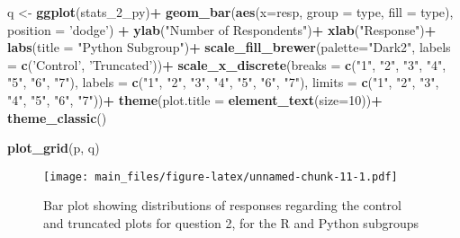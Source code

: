 \documentclass[
]{article}
\newenvironment{Shaded}{\begin{snugshade}}{\end{snugshade}}
\newcommand{\DataTypeTok}[1]{\textcolor[rgb]{0.13,0.29,0.53}{#1}}
\newcommand{\DecValTok}[1]{\textcolor[rgb]{0.00,0.00,0.81}{#1}}
\newcommand{\KeywordTok}[1]{\textcolor[rgb]{0.13,0.29,0.53}{\textbf{#1}}}
\newcommand{\NormalTok}[1]{#1}
\newcommand{\OperatorTok}[1]{\textcolor[rgb]{0.81,0.36,0.00}{\textbf{#1}}}
\newcommand{\StringTok}[1]{\textcolor[rgb]{0.31,0.60,0.02}{#1}}
\begin{document}
\begin{Shaded}
\begin{Highlighting}[]
\NormalTok{q <-}\StringTok{ }\KeywordTok{ggplot}\NormalTok{(stats_}\DecValTok{2}\NormalTok{_py)}\OperatorTok{+}
\StringTok{  }\KeywordTok{geom_bar}\NormalTok{(}\KeywordTok{aes}\NormalTok{(}\DataTypeTok{x=}\NormalTok{resp, }\DataTypeTok{group =}\NormalTok{ type, }\DataTypeTok{fill =}\NormalTok{ type), }\DataTypeTok{position =} \StringTok{'dodge'}\NormalTok{) }\OperatorTok{+}
\StringTok{  }\KeywordTok{ylab}\NormalTok{(}\StringTok{"Number of Respondents"}\NormalTok{)}\OperatorTok{+}
\StringTok{  }\KeywordTok{xlab}\NormalTok{(}\StringTok{"Response"}\NormalTok{)}\OperatorTok{+}
\StringTok{  }\KeywordTok{labs}\NormalTok{(}\DataTypeTok{title =} \StringTok{"Python Subgroup"}\NormalTok{)}\OperatorTok{+}
\StringTok{  }\KeywordTok{scale_fill_brewer}\NormalTok{(}\DataTypeTok{palette=}\StringTok{"Dark2"}\NormalTok{, }\DataTypeTok{labels =} \KeywordTok{c}\NormalTok{(}\StringTok{'Control'}\NormalTok{, }\StringTok{'Truncated'}\NormalTok{))}\OperatorTok{+}
\StringTok{  }\KeywordTok{scale_x_discrete}\NormalTok{(}\DataTypeTok{breaks =} \KeywordTok{c}\NormalTok{(}\StringTok{"1"}\NormalTok{, }\StringTok{"2"}\NormalTok{, }\StringTok{"3"}\NormalTok{, }\StringTok{"4"}\NormalTok{, }\StringTok{"5"}\NormalTok{, }\StringTok{"6"}\NormalTok{, }\StringTok{"7"}\NormalTok{), }\DataTypeTok{labels =} \KeywordTok{c}\NormalTok{(}\StringTok{"1"}\NormalTok{, }\StringTok{"2"}\NormalTok{, }\StringTok{"3"}\NormalTok{, }\StringTok{"4"}\NormalTok{, }\StringTok{"5"}\NormalTok{, }\StringTok{"6"}\NormalTok{, }\StringTok{"7"}\NormalTok{), }\DataTypeTok{limits =} \KeywordTok{c}\NormalTok{(}\StringTok{"1"}\NormalTok{, }\StringTok{"2"}\NormalTok{, }\StringTok{"3"}\NormalTok{, }\StringTok{"4"}\NormalTok{, }\StringTok{"5"}\NormalTok{, }\StringTok{"6"}\NormalTok{, }\StringTok{"7"}\NormalTok{))}\OperatorTok{+}
\StringTok{  }\KeywordTok{theme}\NormalTok{(}\DataTypeTok{plot.title =} \KeywordTok{element_text}\NormalTok{(}\DataTypeTok{size=}\DecValTok{10}\NormalTok{))}\OperatorTok{+}
\StringTok{  }\KeywordTok{theme_classic}\NormalTok{()}
\end{Highlighting}
\end{Shaded}

\begin{Shaded}
\begin{Highlighting}[]
\KeywordTok{plot_grid}\NormalTok{(p, q)}
\end{Highlighting}
\end{Shaded}

\begin{figure}
\centering
\texttt{[image: main\_files/figure-latex/unnamed-chunk-11-1.pdf]}
\caption{Bar plot showing distributions of responses regarding the
control and truncated plots for question 2, for the R and Python
subgroups}
\end{figure}
\end{document}
